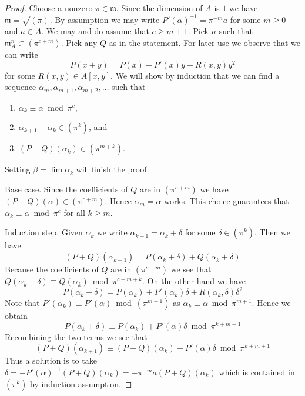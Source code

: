 \documentclass[10pt,a4paper]{amsart}
\theoremstyle{plain}
\theoremstyle{definition}
\theoremstyle{remark}
\numberwithin{equation}{subsection}
\def\lim{\mathop{\mathrm{lim}}\nolimits}
\begin{document}
\begin{proof}
Choose a nonzero $\pi \in \mathfrak m$. Since the dimension of $A$ is $1$
we have $\mathfrak m = \sqrt{(\pi)}$. By assumption we may write
$P'(\alpha)^{-1} = \pi^{-m} a$ for some $m \geq 0$ and $a \in A$.
We may and do assume that $c \geq m + 1$.
Pick $n$ such that $\mathfrak m_A^n \subset (\pi^{c + m})$.
Pick any $Q$ as in the statement. For later use we observe that we can write
$$
P(x + y) = P(x) + P'(x)y + R(x, y)y^2
$$
for some $R(x, y) \in A[x, y]$. We will show by induction that we can find a
sequence $\alpha_m, \alpha_{m + 1}, \alpha_{m + 2}, \ldots$ such that
\begin{enumerate}
\item $\alpha_k \equiv \alpha \bmod \pi^c$,
\item $\alpha_{k + 1} - \alpha_k \in (\pi^k)$, and
\item $(P + Q)(\alpha_k) \in (\pi^{m + k})$.
\end{enumerate}
Setting $\beta = \lim \alpha_k$ will finish the proof.

\medskip\noindent
Base case. Since the coefficients of $Q$ are in $(\pi^{c + m})$ we have
$(P + Q)(\alpha) \in (\pi^{c + m})$. Hence $\alpha_m = \alpha$ works.
This choice guarantees that $\alpha_k \equiv \alpha \bmod \pi^c$
for all $k \geq m$.

\medskip\noindent
Induction step. Given $\alpha_k$ we write
$\alpha_{k + 1} = \alpha_k + \delta$ for some $\delta \in (\pi^k)$.
Then we have
$$
(P + Q)(\alpha_{k + 1}) =
P(\alpha_k + \delta) + Q(\alpha_k + \delta)
$$
Because the coefficients of $Q$ are in $(\pi^{c + m})$ we see that
$Q(\alpha_k + \delta) \equiv Q(\alpha_k) \bmod \pi^{c + m + k}$.
On the other hand we have
$$
P(\alpha_k + \delta) =
P(\alpha_k) + P'(\alpha_k)\delta + R(\alpha_k, \delta)\delta^2
$$
Note that $P'(\alpha_k) \equiv P'(\alpha) \bmod (\pi^{m + 1})$
as $\alpha_k \equiv \alpha \bmod \pi^{m + 1}$. Hence we obtain
$$
P(\alpha_k + \delta) \equiv P(\alpha_k) + P'(\alpha) \delta
\bmod \pi^{k + m + 1}
$$
Recombining the two terms we see that
$$
(P + Q)(\alpha_{k + 1}) \equiv (P + Q)(\alpha_k) + P'(\alpha) \delta
\bmod \pi^{k + m + 1}
$$
Thus a solution is to take
$\delta = -P'(\alpha)^{-1} (P + Q)(\alpha_k) =  - \pi^{-m} a (P + Q)(\alpha_k)$
which is contained in $(\pi^k)$ by induction assumption.
\end{proof}
\end{document}
